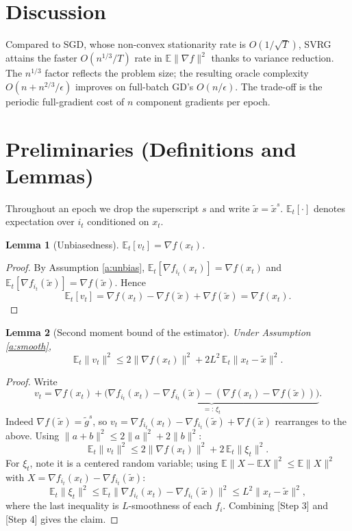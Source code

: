 \documentclass[11pt]{article}
\newtheorem{lemma}{Lemma}
\begin{document}
\section*{Discussion}

Compared to SGD, whose non-convex stationarity rate is $O(1/\sqrt{T})$, SVRG attains the
faster $O(n^{1/3}/T)$ rate in $\mathbb{E}\|\nabla f\|^2$ thanks to variance reduction.
The $n^{1/3}$ factor reflects the problem size; the resulting oracle complexity
$O(n + n^{2/3}/\epsilon)$ improves on full-batch GD's $O(n/\epsilon)$.
The trade-off is the periodic full-gradient cost of $n$ component gradients per epoch.

\section*{Preliminaries (Definitions and Lemmas)}

Throughout an epoch we drop the superscript $s$ and write $\tilde{x}=\tilde{x}^s$.
$\mathbb{E}_t[\cdot]$ denotes expectation over $i_t$ conditioned on $x_t$.

\begin{lemma}[Unbiasedness]\label{lem:unbias}
$\mathbb{E}_t[v_t] = \nabla f(x_t)$.
\end{lemma}
\begin{proof}
By Assumption \ref{a:unbias},
$\mathbb{E}_t[\nabla f_{i_t}(x_t)]=\nabla f(x_t)$ and
$\mathbb{E}_t[\nabla f_{i_t}(\tilde{x})]=\nabla f(\tilde{x})$. Hence
\[
\mathbb{E}_t[v_t] = \nabla f(x_t) - \nabla f(\tilde{x}) + \nabla f(\tilde{x}) = \nabla f(x_t).
\tag*{[Step 1]}
\]
\end{proof}

\begin{lemma}[Second moment bound of the estimator]\label{lem:var}
Under Assumption \ref{a:smooth},
\[
\mathbb{E}_t\|v_t\|^2 \le 2\|\nabla f(x_t)\|^2 + 2L^2\,\mathbb{E}_t\|x_t - \tilde{x}\|^2.
\]
\end{lemma}
\begin{proof}
Write
\[
v_t = \nabla f(x_t) + \underbrace{\big(\nabla f_{i_t}(x_t) - \nabla f_{i_t}(\tilde{x}) - (\nabla f(x_t)-\nabla f(\tilde{x}))\big)}_{=:\,\xi_t}.
\tag*{[Step 2]}
\]
Indeed $\nabla f(\tilde{x})=\tilde{g}^s$, so $v_t = \nabla f_{i_t}(x_t)-\nabla f_{i_t}(\tilde{x})+\nabla f(\tilde x)$ rearranges to the above.
Using $\|a+b\|^2 \le 2\|a\|^2+2\|b\|^2$:
\[
\mathbb{E}_t\|v_t\|^2 \le 2\|\nabla f(x_t)\|^2 + 2\,\mathbb{E}_t\|\xi_t\|^2.
\tag*{[Step 3]}
\]
For $\xi_t$, note it is a centered random variable; using
$\mathbb{E}\|X-\mathbb{E}X\|^2\le \mathbb{E}\|X\|^2$ with
$X=\nabla f_{i_t}(x_t)-\nabla f_{i_t}(\tilde{x})$:
\[
\mathbb{E}_t\|\xi_t\|^2 \le \mathbb{E}_t\|\nabla f_{i_t}(x_t) - \nabla f_{i_t}(\tilde{x})\|^2
\le L^2 \|x_t - \tilde{x}\|^2,
\tag*{[Step 4]}
\]
where the last inequality is $L$-smoothness of each $f_i$. Combining
[Step 3] and [Step 4] gives the claim.
\end{proof}
\end{document}
